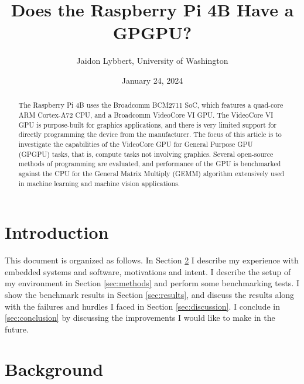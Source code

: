 \documentclass[12pt]{article}
\begin{document}
\title{Does the Raspberry Pi 4B Have a GPGPU?}
\author{Jaidon Lybbert, University of Washington}
\date{January 24, 2024}

\maketitle

\begin{abstract}
The Raspberry Pi 4B uses the Broadcomm BCM2711 SoC, which features a quad-core ARM Cortex-A72 CPU, and a Broadcomm VideoCore VI GPU. The VideoCore VI GPU is purpose-built for graphics applications, and there is very limited support for directly programming the device from the manufacturer. The focus of this article is to investigate the capabilities of the VideoCore GPU for General Purpose GPU (GPGPU) tasks, that is, compute tasks not involving graphics. Several open-source methods of programming are evaluated, and performance of the GPU is benchmarked against the CPU for the General Matrix Multiply (GEMM) algorithm extensively used in machine learning and machine vision applications.
\end{abstract}

\section{Introduction}
This document is organized as follows. In Section \ref{sec:background} I describe my experience with embedded systems and software, motivations and intent. I describe the setup of my environment in Section \ref{sec:methods} and perform some benchmarking tests. I show the benchmark results in Section \ref{sec:results}, and discuss the results along with the failures and hurdles I faced in Section \ref{sec:discussion}. I conclude in \ref{sec:conclusion} by discussing the improvements I would like to make in the future.

\section{Background}\label{sec:background}
\end{document}

